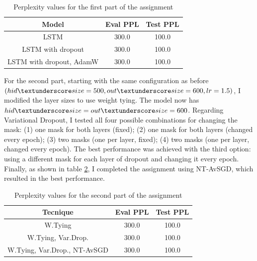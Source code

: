 \documentclass[a4paper]{article}
\begin{document}
\vspace{0.5cm}

\begin{table}[h]
  \centering
  \begin{tabular}{|c|c|c|}
    \hline
    \textbf{Model} & \textbf{Eval PPL} & \textbf{Test PPL} \\
    \hline
    LSTM & 300.0 & 100.0 \\
    LSTM with dropout & 300.0 & 100.0 \\
    LSTM with dropout, AdamW & 300.0 & 100.0 \\
    \hline
  \end{tabular}
  \caption{Perplexity values for the first part of the assignment}
  \label{tab:results1}

\end{table}


For the second part, starting with the same configuration as before \((hid \textunderscore size=500, out \textunderscore size=600, lr=1.5)\), I modified the layer sizes to use weight tying.
The model now has \(hid \textunderscore size=out \textunderscore size=600\).
Regarding Variational Dropout, I tested all four possible combinations for changing the mask: (1) one mask for both layers (fixed); (2) one mask for both layers (changed every epoch); (3) two masks (one per layer, fixed); (4) two masks (one per layer, changed every epoch). The best performance was achieved with the third option: using a different mask for each layer of dropout and changing it every epoch.
Finally, as shown in table \ref{tab:results2}, I completed the assignment using NT-AvSGD, which resulted in the best performance.

\begin{table}[h]
  \centering
  \begin{tabular}{|c|c|c|}
    \hline
    \textbf{Tecnique} & \textbf{Eval PPL} & \textbf{Test PPL} \\
    \hline
    W.Tying & 300.0 & 100.0 \\
    W.Tying, Var.Drop. & 300.0 & 100.0 \\
    W.Tying, Var.Drop., NT-AvSGD & 300.0 & 100.0 \\
    \hline
  \end{tabular}
  \caption{Perplexity values for the second part of the assignment}
  \label{tab:results2}

\end{table}
\end{document}
